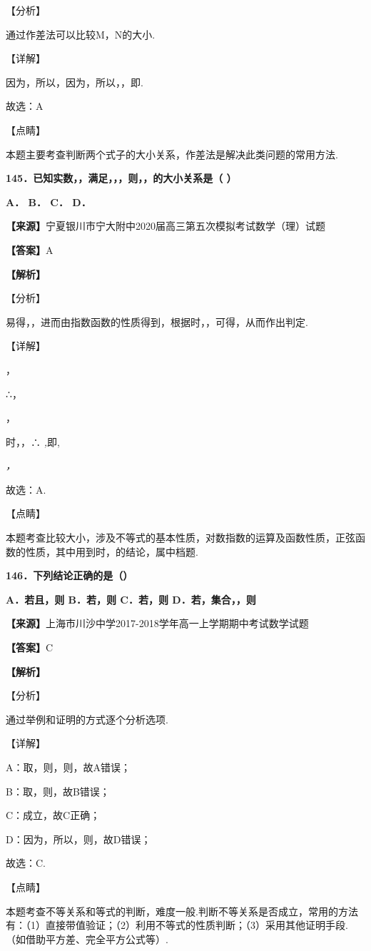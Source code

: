 \documentclass[
]{article}
\begin{document}
【分析】

通过作差法可以比较M，N的大小.

【详解】

因为，所以，因为，所以，，即.

故选：A

【点睛】

本题主要考查判断两个式子的大小关系，作差法是解决此类问题的常用方法.

\textbf{145．已知实数，，满足，，，则，，的大小关系是（ ）}

\textbf{A． B． C． D．}

\textbf{【来源】}宁夏银川市宁大附中2020届高三第五次模拟考试数学（理）试题

\textbf{【答案】}A

\textbf{【解析】}

【分析】

易得，，进而由指数函数的性质得到，根据时，，可得，从而作出判定.

【详解】

，

∴，

，

时，，∴ \emph{,}即,

\emph{，}

故选：A.

【点睛】

本题考查比较大小，涉及不等式的基本性质，对数指数的运算及函数性质，正弦函数的性质，其中用到时，的结论，属中档题.

\textbf{146．下列结论正确的是（）}

\textbf{A．若且，则 B．若，则 C．若，则 D．若，集合，，则}

\textbf{【来源】}上海市川沙中学2017-2018学年高一上学期期中考试数学试题

\textbf{【答案】}C

\textbf{【解析】}

【分析】

通过举例和证明的方式逐个分析选项.

【详解】

A：取，则，则，故A错误；

B：取，则，故B错误；

C：成立，故C正确；

D：因为，所以，则，故D错误；

故选：C.

【点睛】

本题考查不等关系和等式的判断，难度一般.判断不等关系是否成立，常用的方法有：（1）直接带值验证；（2）利用不等式的性质判断；（3）采用其他证明手段.（如借助平方差、完全平方公式等）.
\end{document}
